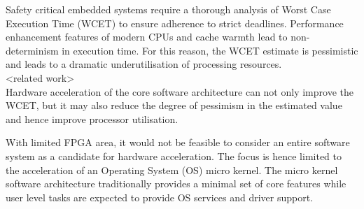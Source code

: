 \documentclass[10pt]{article}
\begin{document}
\maketitle





Safety critical embedded systems require a thorough analysis of Worst Case Execution Time (WCET)
to ensure adherence to strict deadlines. Performance enhancement features of modern
CPUs and cache warmth lead to non-determinism in execution time. For this reason, the WCET estimate
is pessimistic and leads to a dramatic underutilisation of processing resources.
\\


<related work>
\\

Hardware acceleration of the core software architecture can not only improve the WCET, but it may
also reduce the degree of pessimism in the estimated value and hence improve processor utilisation.

With limited FPGA area, it would not be feasible to consider an entire software system as a candidate
for hardware acceleration. The focus is hence limited to the acceleration of an Operating System (OS)
micro kernel. The micro kernel software architecture traditionally provides a minimal set of core
features while user level tasks are expected to provide OS services and driver support.
\end{document}
